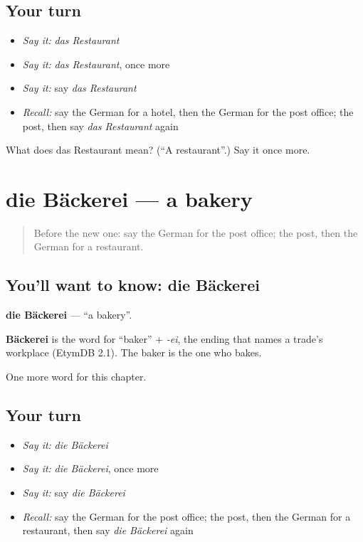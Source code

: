 \subsection*{Your turn}
\begin{itemize}
\raggedright
  \item \emph{Say it:} \emph{das Restaurant}
  \item \emph{Say it:} \emph{das Restaurant}, once more
  \item \emph{Say it:} say \emph{das Restaurant}
  \item \emph{Recall:} say the German for a hotel, then the German for the post office; the post, then say \emph{das Restaurant} again
\end{itemize}

\begin{tcolorbox}[breakable,colback=teal!4,colframe=teal!35!black,title={Before you move on}]
What does das Restaurant mean? (\textquotedblleft{}A restaurant\textquotedblright{}.) Say it once more.
\end{tcolorbox}
\section[die Bäckerei]{die Bäckerei — a bakery}

\label{lesson:GE-C105-baeckerei}



\begin{quote}
Before the new one: say the German for the post office; the post, then the German for a restaurant.
\end{quote}

\subsection*{You'll want to know: die Bäckerei}
\textbf{die Bäckerei} — \textquotedblleft{}a bakery\textquotedblright{}.

\begin{cousinweb}
\textbf{Bäckerei} is the word for \textquotedblleft{}baker\textquotedblright{} + \emph{-ei}, the ending that names a trade's workplace (EtymDB 2.1). The baker is the one who bakes.
\end{cousinweb}

\begin{grammarlens}[title={What you've built}]
One more word for this chapter.
\end{grammarlens}

\subsection*{Your turn}
\begin{itemize}
\raggedright
  \item \emph{Say it:} \emph{die Bäckerei}
  \item \emph{Say it:} \emph{die Bäckerei}, once more
  \item \emph{Say it:} say \emph{die Bäckerei}
  \item \emph{Recall:} say the German for the post office; the post, then the German for a restaurant, then say \emph{die Bäckerei} again
\end{itemize}


